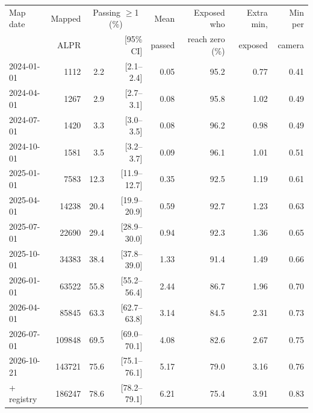 \begin{tabular}{lrrrrrrr}
\toprule
Map date & Mapped & \multicolumn{2}{c}{Passing $\geq$1 (\%)} & Mean & Exposed who & Extra min, & Min per \\
& ALPR & & [95\% CI] & passed & reach zero (\%) & exposed & camera \\
\midrule
2024-01-01 & \num{1112} & \num{2.2} & [2.1--2.4] & \num{0.05} & \num{95.2} & \num{0.77} & \num{0.41} \\
2024-04-01 & \num{1267} & \num{2.9} & [2.7--3.1] & \num{0.08} & \num{95.8} & \num{1.02} & \num{0.49} \\
2024-07-01 & \num{1420} & \num{3.3} & [3.0--3.5] & \num{0.08} & \num{96.2} & \num{0.98} & \num{0.49} \\
2024-10-01 & \num{1581} & \num{3.5} & [3.2--3.7] & \num{0.09} & \num{96.1} & \num{1.01} & \num{0.51} \\
2025-01-01 & \num{7583} & \num{12.3} & [11.9--12.7] & \num{0.35} & \num{92.5} & \num{1.19} & \num{0.61} \\
2025-04-01 & \num{14238} & \num{20.4} & [19.9--20.9] & \num{0.59} & \num{92.7} & \num{1.23} & \num{0.63} \\
2025-07-01 & \num{22690} & \num{29.4} & [28.9--30.0] & \num{0.94} & \num{92.3} & \num{1.36} & \num{0.65} \\
2025-10-01 & \num{34383} & \num{38.4} & [37.8--39.0] & \num{1.33} & \num{91.4} & \num{1.49} & \num{0.66} \\
2026-01-01 & \num{63522} & \num{55.8} & [55.2--56.4] & \num{2.44} & \num{86.7} & \num{1.96} & \num{0.70} \\
2026-04-01 & \num{85845} & \num{63.3} & [62.7--63.8] & \num{3.14} & \num{84.5} & \num{2.31} & \num{0.73} \\
2026-07-01 & \num{109848} & \num{69.5} & [69.0--70.1] & \num{4.08} & \num{82.6} & \num{2.67} & \num{0.75} \\
2026-10-21 & \num{143721} & \num{75.6} & [75.1--76.1] & \num{5.17} & \num{79.0} & \num{3.16} & \num{0.76} \\
\midrule
\quad + registry & \num{186247} & \num{78.6} & [78.2--79.1] & \num{6.21} & \num{75.4} & \num{3.91} & \num{0.83} \\
\bottomrule
\end{tabular}
